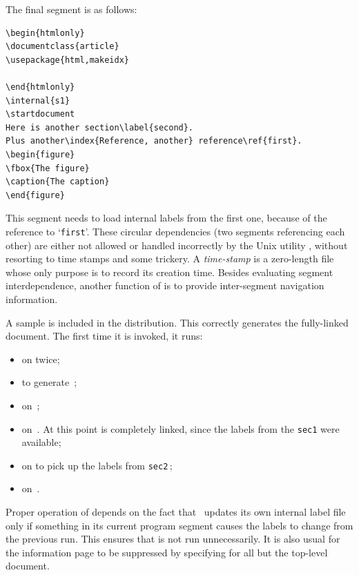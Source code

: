 \medskip\htmlrule[width=300]
\html{\\}\noindent
The final segment  is as follows:
\begin{small}
\begin{verbatim}
\begin{htmlonly}
\documentclass{article}
\usepackage{html,makeidx}

\end{htmlonly}
\internal{s1}
\startdocument
Here is another section\label{second}.
Plus another\index{Reference, another} reference\ref{first}.
\begin{figure}
\fbox{The figure}
\caption{The caption}
\end{figure}
\end{verbatim}
\end{small}
%
%
%
\html{\\}\noindent
This segment needs to load internal labels from the first one,
because of the reference to `\texttt{first}'.  These circular
dependencies (two segments referencing each other) are either not
allowed or handled incorrectly by the Unix utility , 
without resorting to time stamps and some trickery.  
A \textit{time-stamp} is a zero-length file whose only purpose is to record
its creation time.  
Besides evaluating segment interdependence,
another function of  is to provide inter-segment
navigation information.

\medskip\htmlrule[width=300]
\html{\\}\noindent
A sample  is included in the distribution.
This correctly generates the fully-linked document.
The first time it is invoked, it runs:
\begin{itemize}
\item {} on  twice;
\item {} to generate \,;
\item {} on \,;
\item {} on \,.  
At this point  is completely linked, 
since the labels from the \texttt{sec1} were available;
\item {} on  to pick up the labels from \texttt{sec2}\,;
\item {} on \,.
\end{itemize}
Proper operation of  depends on the fact that
\latextohtml\ updates
its own internal label file only if something in its
current program segment causes the labels to change from the previous run.  
This ensures that \latextohtml{} is not run unnecessarily. 
It is also usual for the information page to be suppressed by specifying 
 for all but the top-level document.%

